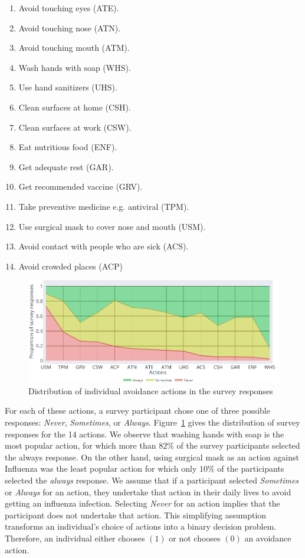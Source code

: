 \documentclass[doublespace]{VTthesis}
\begin{document}
	\begin{enumerate}
	    \item Avoid touching eyes (ATE).
	    \item Avoid touching nose (ATN).
	    \item Avoid touching mouth (ATM).
        \item Wash hands with soap (WHS).
        \item Use hand sanitizers (UHS).
        \item Clean surfaces at home (CSH).
        \item Clean surfaces at work (CSW).
        \item Eat nutritious food (ENF).
        \item Get adequate rest (GAR).
        \item Get recommended vaccine (GRV).
        \item Take preventive medicine e.g. antiviral (TPM).
        \item Use surgical mask to cover nose and mouth (USM).
        \item Avoid contact with people who are sick (ACS).
        \item Avoid crowded places (ACP)
	\end{enumerate}
	\begin{figure}
    \centering
    \includegraphics[width=\textwidth]{figures/avoidancebehaviors.png}
    \caption{Distribution of individual avoidance actions in the survey responses}
    \label{fig:avoidance}
    \end{figure}
	For each of these actions, a survey participant chose one of three possible responses: \emph{Never}, \emph{Sometimes}, or \emph{Always}. Figure~\ref{fig:avoidance} gives the distribution of survey responses for the 14 actions. We observe that washing hands with soap is the most popular action, for which more than $82\%$ of the survey participants selected the always response. On the other hand, using surgical mask as an action against Influenza was the least popular action for which only $10\%$ of the participants selected the \emph{always} response. We assume that if a participant selected \emph{Sometimes} or \emph{Always} for an action, they undertake that action in their daily lives to avoid getting an influenza infection. Selecting \emph{Never} for an action implies that the participant does not undertake that action. This simplifying assumption transforms an individual's choice of actions into a binary decision problem. Therefore, an individual either chooses $(1)$ or not chooses $(0)$ an avoidance action.  
\end{document}
